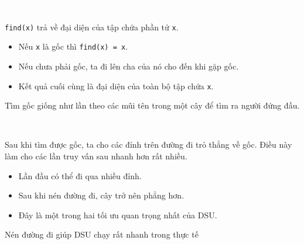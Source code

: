 \documentclass{beamer}
\newcommand{\hlblue}[1]{\textcolor{myblue}{#1}}
\newcommand{\hlgreen}[1]{\textcolor{mygreen}{#1}}
\newcommand{\hlred}[1]{\textcolor{myred}{#1}}
\newcommand{\hlorange}[1]{\textcolor{myorange}{#1}}
\newcommand{\hlwhite}[1]{\textcolor{white}{#1}}
\begin{document}
\begin{frame}{\hlwhite{Hàm \texttt{find(x)}}}
\begin{tcolorbox}[title=\textbf{\hlgreen{Mục đích}}]
\texttt{find(x)} trả về \hlred{đại diện của tập} chứa phần tử \texttt{x}.
\end{tcolorbox}

\begin{itemize}
  \item Nếu \texttt{x} là gốc thì \texttt{find(x) = x}.
  \item Nếu chưa phải gốc, ta đi lên cha của nó cho đến khi gặp gốc.
  \item Kết quả cuối cùng là đại diện của toàn bộ tập chứa \texttt{x}.
\end{itemize}

\pause

\begin{tcolorbox}[title=\textbf{\hlgreen{Trực giác}}]
\hlblue{Tìm gốc} giống như lần theo các mũi tên trong một cây để tìm ra người đứng đầu.
\end{tcolorbox}
\end{frame}


\begin{frame}{\hlwhite{Tối ưu hàm \texttt{find(x)}: nén đường đi}}
\begin{tcolorbox}[title=\textbf{\hlgreen{Nén đường đi}}]
Sau khi tìm được gốc, ta \hlred{cho các đỉnh trên đường đi trỏ thẳng về gốc}. Điều này làm cho các lần truy vấn sau nhanh hơn rất nhiều.
\end{tcolorbox}

\begin{itemize}
  \item Lần đầu có thể đi qua nhiều đỉnh.
  \item Sau khi nén đường đi, cây trở nên phẳng hơn.
  \item Đây là một trong hai tối ưu quan trọng nhất của DSU.
\end{itemize}

\pause

\begin{tcolorbox}
\centering
\hlorange{Nén đường đi giúp DSU chạy rất nhanh trong thực tế}
\end{tcolorbox}
\end{frame}

\end{document}
